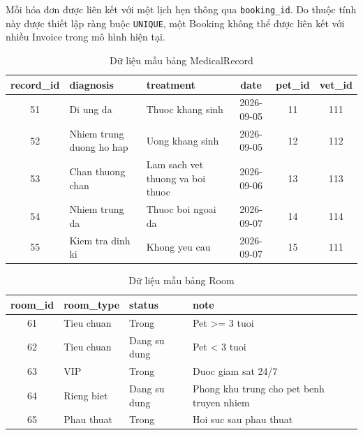 Mỗi hóa đơn được liên kết với một lịch hẹn thông qua \texttt{booking\_id}.
Do thuộc tính này được thiết lập ràng buộc \texttt{UNIQUE}, một Booking
không thể được liên kết với nhiều Invoice trong mô hình hiện tại.

\begin{table}[htbp]
    \centering
    \caption{Dữ liệu mẫu bảng MedicalRecord}
    \label{tab:data_medical_record}
    \begin{tabularx}{\textwidth}{|c|X|X|c|c|c|}
        \hline
        \textbf{record\_id} &
        \textbf{diagnosis} &
        \textbf{treatment} &
        \textbf{date} &
        \textbf{pet\_id} &
        \textbf{vet\_id} \\ \hline

        51 &
        Di ung da &
        Thuoc khang sinh &
        2026-09-05 &
        11 &
        111 \\ \hline

        52 &
        Nhiem trung duong ho hap &
        Uong khang sinh &
        2026-09-05 &
        12 &
        112 \\ \hline

        53 &
        Chan thuong chan &
        Lam sach vet thuong va boi thuoc &
        2026-09-06 &
        13 &
        113 \\ \hline

        54 &
        Nhiem trung da &
        Thuoc boi ngoai da &
        2026-09-07 &
        14 &
        114 \\ \hline

        55 &
        Kiem tra dinh ki &
        Khong yeu cau &
        2026-09-07 &
        15 &
        111 \\ \hline

    \end{tabularx}
\end{table}

\begin{table}[htbp]
    \centering
    \caption{Dữ liệu mẫu bảng Room}
    \label{tab:data_room}
    \begin{tabular}{|c|l|l|l|}
        \hline
        \textbf{room\_id} & \textbf{room\_type} & \textbf{status} & \textbf{note} \\ \hline

        61 & Tieu chuan & Trong & Pet >= 3 tuoi \\ \hline
        62 & Tieu chuan & Dang su dung & Pet < 3 tuoi \\ \hline
        63 & VIP & Trong & Duoc giam sat 24/7 \\ \hline
        64 & Rieng biet & Dang su dung & Phong khu trung cho pet benh truyen nhiem \\ \hline
        65 & Phau thuat & Trong & Hoi suc sau phau thuat \\ \hline

    \end{tabular}
\end{table}

